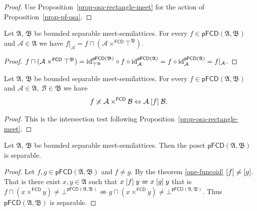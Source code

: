 \begin{proof}
Use Proposition~\ref{prop-osa-rectangle-meet} for the action
of Proposition~\ref{prop-pf-osa}.
\end{proof}
\begin{cor}
Let $\mathfrak{A}$, $\mathfrak{B}$ be bounded separable
meet-semilattices. For every $f\in\mathsf{pFCD}(\mathfrak{A},\mathfrak{B})$
and $\mathcal{A}\in\mathfrak{A}$ we have $f|_{\mathcal{A}}=f\sqcap(\mathcal{A}\times^{\mathsf{FCD}}\top^{\mathfrak{B}})$.\end{cor}
\begin{proof}
$\text{\ensuremath{f\sqcap(\mathcal{A}\times^{\mathsf{FCD}}\top^{\mathfrak{B}})}}={\operatorname{id}}_{\top^{\mathfrak{B}}}^{\mathsf{pFCD}(\mathfrak{B})}\circ f\circ{\operatorname{id}}_{\mathcal{A}}^{\mathsf{pFCD}(\mathfrak{A})}=f\circ{\operatorname{id}}_{\mathcal{A}}^{\mathsf{pFCD}(\mathfrak{A})}=f|_{\mathcal{A}}$.\end{proof}
\begin{cor}
\label{pf-intr-prod}Let $\mathfrak{A}$, $\mathfrak{B}$ be
bounded separable meet-semilattices. For every $f\in\mathsf{pFCD}(\mathfrak{A},\mathfrak{B})$
and $\mathcal{A}\in\mathfrak{A}$, $\mathcal{B}\in\mathfrak{B}$ we
have
\[
f\not\asymp\mathcal{A}\times^{\mathsf{FCD}}\mathcal{B}\Leftrightarrow\mathcal{A}\mathrel{\left[f\right]}\mathcal{B}.
\]
\end{cor}
\begin{proof}
This is the intersection test following
Proposition~\ref{prop-osa-rectangle-meet}.
\end{proof}
\begin{thm}
\label{pf-fcd-sep}Let $\mathfrak{A}$, $\mathfrak{B}$ be bounded separable meet-semilattices. Then the poset $\mathsf{pFCD}(\mathfrak{A},\mathfrak{B})$
is separable.\end{thm}
\begin{proof}
Let $f,g\in\mathsf{pFCD}(\mathfrak{A},\mathfrak{B})$ and $f\neq g$.
By the theorem \ref{one-funcoid} $\mathord{\mathrel{\left[f\right]}}\neq\mathord{\mathrel{\left[g\right]}}$.
That is there exist $x,y\in\mathfrak{A}$ such that $x\mathrel{\left[f\right]}y\nLeftrightarrow x\mathrel{\left[g\right]}y$
that is $f\sqcap(x\times^{\mathsf{FCD}}y)\neq\bot^{\mathsf{pFCD}(\mathfrak{A},\mathfrak{B})}\nLeftrightarrow g\sqcap(x\times^{\mathsf{FCD}}y)\neq\bot^{\mathsf{pFCD}(\mathfrak{A},\mathfrak{B})}$.
Thus $\mathsf{pFCD}(\mathfrak{A},\mathfrak{B})$ is separable.\end{proof}


